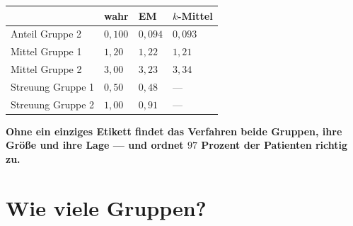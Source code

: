 \begin{merksatz}
\begin{center}
{\small
\renewcommand{\arraystretch}{1.5}
\begin{tabular}{@{}P{2.6cm}P{1.8cm}P{1.8cm}P{2.0cm}@{}}
\toprule
& \textbf{wahr} & \textbf{EM} & \textbf{$k$-Mittel}\\
\midrule
Anteil Gruppe 2 & $0{,}100$ & $0{,}094$ & $0{,}093$\\
Mittel Gruppe 1 & $1{,}20$ & $1{,}22$ & $1{,}21$\\
Mittel Gruppe 2 & $3{,}00$ & $3{,}23$ & $3{,}34$\\
Streuung Gruppe 1 & $0{,}50$ & $0{,}48$ & ---\\
Streuung Gruppe 2 & $1{,}00$ & $0{,}91$ & ---\\
\bottomrule
\end{tabular}}
\end{center}

\begin{center}
\begin{minipage}{0.9\textwidth}
\textbf{Ohne ein einziges Etikett findet das Verfahren beide Gruppen, ihre Größe und ihre Lage --- und ordnet $97$ Prozent der Patienten richtig zu.}
\end{minipage}
\end{center}

\begin{center}
\begin{minipage}{0.88\textwidth}
\end{minipage}
\end{center}
\end{merksatz}

\section{Wie viele Gruppen?}

